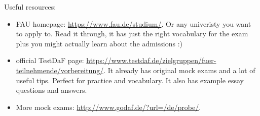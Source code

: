 \documentclass[12pt]{article}
\begin{document}
\myspace{}
Useful resources:
\begin{itemize}
    \item FAU homepage: \url{https://www.fau.de/studium/}. Or any univeristy you want to apply to.
        Read it through, it has just the right vocabulary for the exam plus you might actually learn about the admissions :)
    \item official TestDaF page: \url{https://www.testdaf.de/zielgruppen/fuer-teilnehmende/vorbereitung/}.
        It already has original mock exams and a lot of useful tips. Perfect for practice and vocabulary.
        It also has example essay questions and answers. 
    \item More mock exams: \url{http://www.godaf.de/?url=/de/probe/}.
    
\end{itemize}
\end{document}
